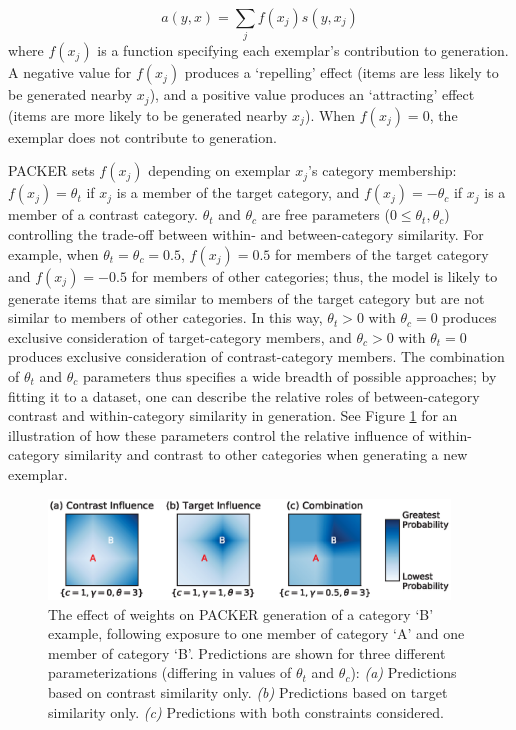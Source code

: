 \documentclass[pdflatex,sn-apa]{sn-jnl}%
\theoremstyle{thmstyleone}%
\theoremstyle{thmstyletwo}%
\theoremstyle{thmstylethree}%
\begin{document}
\begin{equation} a(y, x) = \sum_j{f(x_j) s(y, x_j)}
\end{equation}
% 
where $f(x_j)$ is a function specifying each exemplar's contribution to
generation. A negative value for $f(x_j)$ produces a `repelling' effect (items
are less likely to be generated nearby $x_j$), and a positive value produces an
`attracting' effect (items are more likely to be generated nearby $x_j$). When
$f(x_j)=0$, the exemplar does not contribute to generation.

PACKER sets $f(x_j)$ depending on exemplar $x_j$'s category membership:
$f(x_j) = \theta_t$ if $x_j$ is a member of the target category, and
$f(x_j) = -\theta_c$ if $x_j$ is a member of a contrast category. $\theta_t$ and
$\theta_c$ are free parameters ($0 \leq \theta_t,\theta_c$) controlling the
trade-off between within- and between-category similarity. For example, when
$\theta_t = \theta_c = 0.5$, $f(x_j) = 0.5$ for members of the target category
and $f(x_j) = -0.5$ for members of other categories; thus, the model is likely
to generate items that are similar to members of the target category but are not
similar to members of other categories. In this way, $\theta_t > 0$ with
$\theta_c = 0$ produces exclusive consideration of target-category members, and
$\theta_c > 0$ with $\theta_t = 0$ produces exclusive consideration of
contrast-category members. The combination of $\theta_t$ and $\theta_c$
parameters thus specifies a wide breadth of possible approaches; by fitting it
to a dataset, one can describe the relative roles of between-category contrast
and within-category similarity in generation. See Figure
\ref{fig:packer-examples} for an illustration of how these parameters control
the relative influence of within-category similarity and contrast to other
categories when generating a new exemplar.

\begin{figure}
	\begin{center} 
    \includegraphics[width=0.95\textwidth]{figs/fig1.eps}
      \caption{The effect of weights on PACKER generation of a category `B' example, following exposure
        to one member of category `A' and one member of category `B'.
        Predictions are shown for three different parameterizations (differing
        in values of $\theta_t$ and $\theta_c$): {\em (a)}
        Predictions based on contrast similarity only. {\em (b)}
        Predictions based on target similarity only. {\em (c)} Predictions with
        both constraints considered.}
		\label{fig:packer-examples}
	\end{center}
\end{figure}
\end{document}
